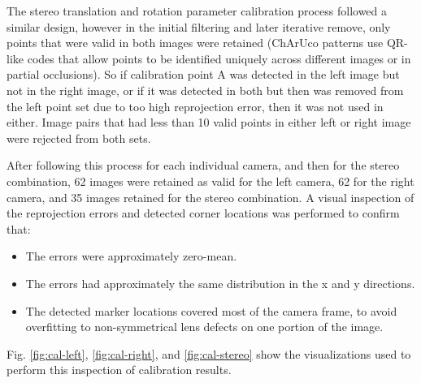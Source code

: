 The stereo translation and rotation parameter calibration process followed a similar design, however in the initial filtering and later iterative remove, only points 
that were valid in both images were retained (ChArUco patterns use QR-like codes that allow points to be identified uniquely across different images or in partial occlusions).
So if calibration point A was detected in the left image but not in the right image, or if it was detected in both but then was removed from the left point set due to too high 
reprojection error, then it was not used in either. Image pairs that had less than 10 valid points in either left or right image were rejected from both sets. 

After following this process for each individual camera, and then for the stereo combination, 62 images were retained as valid for the left camera, 62 for the right camera, and 
35 images retained for the stereo combination. A visual inspection of the reprojection errors and detected corner locations was performed to confirm that:

\begin{itemize}
    \item The errors were approximately zero-mean.
    \item The errors had approximately the same distribution in the x and y directions.
    \item The detected marker locations covered most of the camera frame, to avoid overfitting to non-symmetrical lens defects on one portion of the image. 
\end{itemize}

Fig. \ref{fig:cal-left}, \ref{fig:cal-right}, and \ref{fig:cal-stereo} show the visualizations used to perform this inspection of calibration results.

